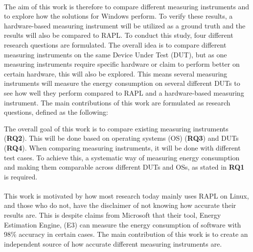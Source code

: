\paragraph*{}
The aim of this work is therefore to compare different measuring instruments and to explore how the solutions for Windows perform. To verify these results, a hardware-based measuring instrument will be utilized as a ground truth and the results will also be compared to RAPL. To conduct this study, four different research questions are formulated. The overall idea is to compare different measuring instruments on the same Device Under Test (DUT), but as one measuring instruments require specific hardware or claim to perform better on certain hardware, this will also be explored. This means several measuring instruments will measure the energy consumption on several different DUTs to see how well they perform compared to RAPL and a hardware-based measuring instrument. The main contributions of this work are formulated as research questions, defined as the following:



The overall goal of this work is to compare existing measuring instruments (\textbf{RQ2}). This will be done based on operating systems (OS) (\textbf{RQ3}) and DUTs (\textbf{RQ4}). When comparing measuring instruments, it will be done with different test cases. To achieve this, a systematic way of measuring energy consumption and making them comparable across different DUTs and OSs, as stated in \textbf{RQ1} is required.

\paragraph*{}
This work is motivated by how most research today mainly uses RAPL on Linux\cite[]{Rasmussen2021,Pereira2017,Theilmann2022,Lindholt2022}, and those who do not, have the disclaimer of not knowing how accurate their results are\cite[]{Bruce2015ReducingEC, Ozturk2019, Unlu2021}. This is despite claims from Microsoft that their tool, Energy Estimation Engine, (E3) can measure the energy consumption of software with 98\% accuracy in certain cases\cite[]{E3WinHec}. The main contribution of this work is to create an independent source of how accurate different measuring instruments are.

